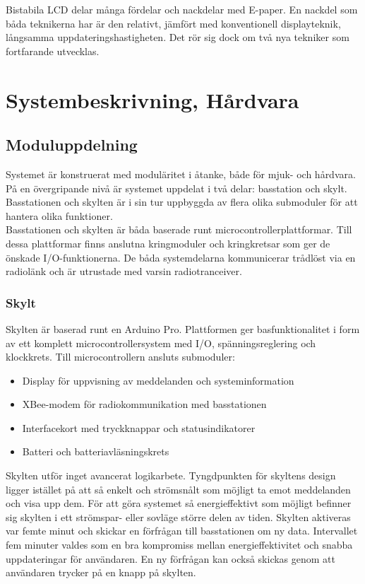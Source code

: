 \documentclass[a4paper,11pt]{article}
\begin{document}
Bistabila LCD delar många fördelar och nackdelar med E-paper. En nackdel som båda teknikerna har är den relativt, jämfört med konventionell displayteknik, långsamma uppdateringshastigheten. Det rör sig dock om två nya tekniker som fortfarande utvecklas.

\section{Systembeskrivning, Hårdvara}

\subsection{Moduluppdelning}
Systemet är konstruerat med moduläritet i åtanke, både för mjuk- och hårdvara. På en övergripande nivå är systemet uppdelat i två delar: basstation och skylt. Basstationen och skylten är i sin tur uppbyggda av flera olika submoduler för att hantera olika funktioner. \\

Basstationen och skylten är båda baserade runt microcontrollerplattformar. Till dessa plattformar finns anslutna kringmoduler och kringkretsar som ger de önskade I/O-funktionerna. De båda systemdelarna kommunicerar trådlöst via en radiolänk och är utrustade med varsin radiotranceiver.

\subsubsection{Skylt}
Skylten är baserad runt en Arduino Pro. Plattformen ger basfunktionalitet i form av ett komplett microcontrollersystem med I/O, spänningsreglering och klockkrets. Till microcontrollern ansluts submoduler:
	
	\begin{itemize}
    	\item Display för uppvisning av meddelanden och systeminformation
    	\item XBee-modem för radiokommunikation med basstationen
    	\item Interfacekort med tryckknappar och statusindikatorer
    	\item Batteri och batteriavläsningskrets
	\end{itemize}
	
Skylten utför inget avancerat logikarbete. Tyngdpunkten för skyltens design ligger istället på att så enkelt och strömsnålt som möjligt ta emot meddelanden och visa upp dem. För att göra systemet så energieffektivt som möjligt befinner sig skylten i ett strömspar- eller sovläge större delen av tiden. Skylten aktiveras var femte minut och skickar en förfrågan till basstationen om ny data. Intervallet fem minuter valdes som en bra kompromiss mellan energieffektivitet och snabba uppdateringar för användaren. En ny förfrågan kan också skickas genom att användaren trycker på en knapp på skylten.\\
\end{document}
